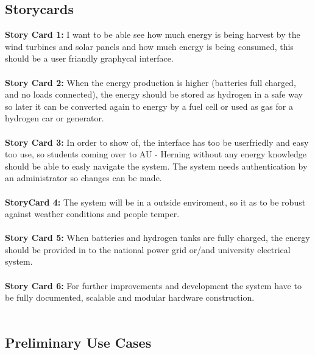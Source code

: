 \subsection{Storycards}
\textbf{Story Card 1:} I want to be able see how much energy is being harvest by
the wind turbines and solar panels and how much energy is being consumed, this should be
a user friandly graphycal interface.\\\\
\textbf{Story Card 2:} When the energy production is higher (batteries full
charged, and no loads connected), the energy should be stored as hydrogen in a safe way so
later it can be converted again to energy by a fuel cell or used as gas for a
hydrogen car or generator.\\\\
\textbf{Story Card 3:} In order to show of, the interface has too be userfriedly
and easy too use, so students coming over to AU - Herning without any energy
knowledge should be able to easly navigate the system. The system needs
authentication by an administrator so changes can be made.\\\\
\textbf{StoryCard 4:} The system will be in a outside enviroment, so it as to be robust against weather conditions and people temper.\\\\
\textbf{Story Card 5:} When batteries and hydrogen tanks are fully charged, the
energy should be provided in to the national power grid or/and university electrical
system.\\\\
\textbf{Story Card 6:} For further improvements and development the system have
to be fully documented, scalable and modular hardware construction.\\\\

\subsection{Preliminary Use Cases}

